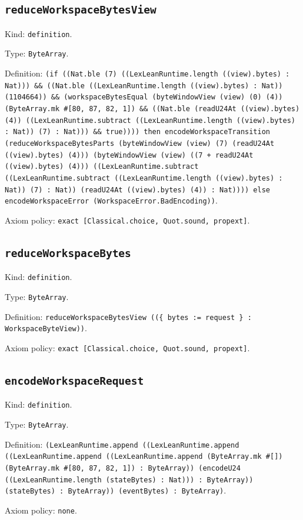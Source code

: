 \documentclass[11pt]{article}
\begin{document}
\subsection*{\texttt{reduceWorkspaceBytesView}}
\noindent Kind: \texttt{definition}.\par
\noindent Type: \texttt{ByteArray}.\par
\noindent Definition: \texttt{(if ((Nat.ble (7) ((LexLeanRuntime.length ((view).bytes) : Nat))) \&\& ((Nat.ble ((LexLeanRuntime.length ((view).bytes) : Nat)) (1104664)) \&\& (workspaceBytesEqual (byteWindowView (view) (0) (4)) (ByteArray.mk \#[80, 87, 82, 1]) \&\& ((Nat.ble (readU24At ((view).bytes) (4)) ((LexLeanRuntime.subtract ((LexLeanRuntime.length ((view).bytes) : Nat)) (7) : Nat))) \&\& true)))) then encodeWorkspaceTransition (reduceWorkspaceBytesParts (byteWindowView (view) (7) (readU24At ((view).bytes) (4))) (byteWindowView (view) ((7 + readU24At ((view).bytes) (4))) ((LexLeanRuntime.subtract ((LexLeanRuntime.subtract ((LexLeanRuntime.length ((view).bytes) : Nat)) (7) : Nat)) (readU24At ((view).bytes) (4)) : Nat)))) else encodeWorkspaceError (WorkspaceError.BadEncoding))}.\par
\noindent Axiom policy: \texttt{exact [Classical.choice, Quot.sound, propext]}.\par
\subsection*{\texttt{reduceWorkspaceBytes}}
\noindent Kind: \texttt{definition}.\par
\noindent Type: \texttt{ByteArray}.\par
\noindent Definition: \texttt{reduceWorkspaceBytesView ((\{ bytes := request \} : WorkspaceByteView))}.\par
\noindent Axiom policy: \texttt{exact [Classical.choice, Quot.sound, propext]}.\par
\subsection*{\texttt{encodeWorkspaceRequest}}
\noindent Kind: \texttt{definition}.\par
\noindent Type: \texttt{ByteArray}.\par
\noindent Definition: \texttt{(LexLeanRuntime.append ((LexLeanRuntime.append ((LexLeanRuntime.append ((LexLeanRuntime.append (ByteArray.mk \#[]) (ByteArray.mk \#[80, 87, 82, 1]) : ByteArray)) (encodeU24 ((LexLeanRuntime.length (stateBytes) : Nat))) : ByteArray)) (stateBytes) : ByteArray)) (eventBytes) : ByteArray)}.\par
\noindent Axiom policy: \texttt{none}.\par
\end{document}
